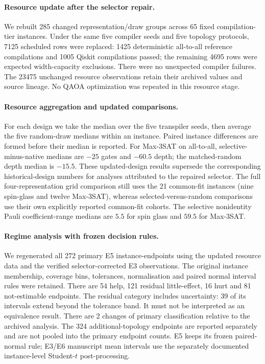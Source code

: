 \paragraph{Resource update after the selector repair.}
We rebuilt 285 changed representation/draw groups across 65 fixed
compilation-tier instances. Under the same five compiler seeds and five topology
protocols, 7125 scheduled rows were replaced: 1425 deterministic
all-to-all reference compilations and 1005 Qiskit compilations passed; the remaining
4695 rows were expected width-capacity exclusions. There were no unexpected
compiler failures. The 23475 unchanged resource observations retain their archived values
and source lineage. No QAOA optimization was repeated in this resource stage.

\paragraph{Resource aggregation and updated comparisons.}
For each design we take the median over the five transpiler seeds, then average
the five random-draw medians within an instance. Paired instance differences
are formed before their median is reported. For Max-3SAT on all-to-all,
selective-minus-native medians are $-25$ gates and
$-60.5$ depth; the matched-random depth median is
$-15.5$.
These updated-design results supersede the corresponding historical-design
numbers for analyses attributed to the repaired selector.
The full four-representation grid comparison still uses the 21 common-fit
instances (nine spin-glass and twelve Max-3SAT), whereas selected-versus-random
comparisons use their own explicitly reported common-fit cohorts.
The selective nonidentity Pauli coefficient-range medians are
$5.5$ for spin glass and $59.5$ for Max-3SAT.

\paragraph{Regime analysis with frozen decision rules.}
We regenerated all 272 primary E5 instance-endpoints using the updated
resource data and the verified selector-corrected E3 observations. The original
instance membership, coverage bins, tolerances, normalisation and paired normal
interval rules were retained. There are 54 help, 121 residual little-effect,
16 hurt and 81 not-estimable endpoints. The residual category includes
uncertainty: 39 of its intervals extend beyond the tolerance band.
It must not be interpreted as an equivalence result. There are
2 changes of primary classification relative to the archived analysis.
The 324 additional-topology endpoints are reported separately and are not pooled
into the primary endpoint counts. E5 keeps its frozen paired-normal rule;
E3/E6 manuscript mean intervals use the separately documented instance-level
Student-$t$ post-processing.
